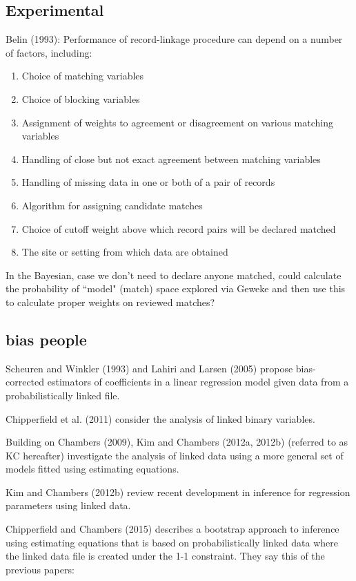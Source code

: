 \documentclass[11pt,reqno]{amsart}
\begin{document}
\subsection{Experimental}
Belin (1993): Performance of record-linkage procedure can depend on a number of factors, including:
\begin{enumerate}
\item Choice of matching variables
\item Choice of blocking variables
\item Assignment of weights to agreement or disagreement on various matching variables
\item Handling of close but not exact agreement between matching variables
\item Handling of missing data in one or both of a pair of records
\item Algorithm for assigning candidate matches
\item Choice of cutoff weight above which record pairs will be declared matched
\item The site or setting from which data are obtained
\end{enumerate}
In the Bayesian, case we don't need to declare anyone matched, could calculate the probability of  ``model" (match) space explored via Geweke and then use this to calculate proper weights on reviewed matches?  
\subsection{bias people}
Scheuren and Winkler (1993) and Lahiri and Larsen (2005) propose bias-corrected estimators of coefficients in a linear regression model given data from a probabilistically linked file. 

Chipperfield et al. (2011) consider the analysis of linked binary variables.

Building on Chambers (2009), Kim and Chambers (2012a, 2012b) (referred to as KC hereafter) investigate the analysis of linked data using a more general set of models fitted using estimating equations.

Kim and Chambers (2012b) review recent development in inference for regression parameters
using linked data.

Chipperfield and Chambers (2015) describes a bootstrap approach to inference using estimating equations that is based on probabilistically linked data where the linked data file is created under the 1-1 constraint.  They say this of the previous papers: 
\end{document}
